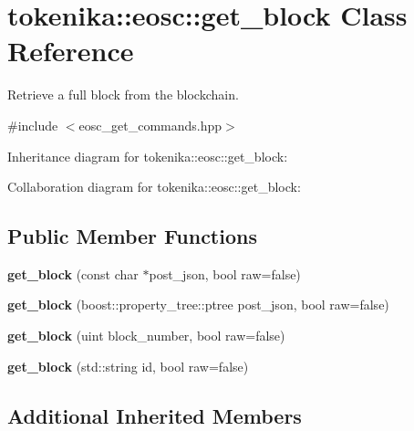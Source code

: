 \hypertarget{classtokenika_1_1eosc_1_1get__block}{}\section{tokenika\+:\+:eosc\+:\+:get\+\_\+block Class Reference}
\label{classtokenika_1_1eosc_1_1get__block}


Retrieve a full block from the blockchain.  




{\ttfamily \#include $<$eosc\+\_\+get\+\_\+commands.\+hpp$>$}



Inheritance diagram for tokenika\+:\+:eosc\+:\+:get\+\_\+block\+:


Collaboration diagram for tokenika\+:\+:eosc\+:\+:get\+\_\+block\+:
\subsection*{Public Member Functions}
\begin{DoxyCompactItemize}
\item 
\mbox{\label{classtokenika_1_1eosc_1_1get__block_ae2c0ee2ee1f93c982be9644238ac2e08}} 
{\bfseries get\+\_\+block} (const char $\ast$post\+\_\+json, bool raw=false)
\item 
\mbox{\label{classtokenika_1_1eosc_1_1get__block_a8d6bd95d65d6bd8265dc3fb23e5e0350}} 
{\bfseries get\+\_\+block} (boost\+::property\+\_\+tree\+::ptree post\+\_\+json, bool raw=false)
\item 
\mbox{\label{classtokenika_1_1eosc_1_1get__block_aa10c691423132ab06125109f47fee9c8}} 
{\bfseries get\+\_\+block} (uint block\+\_\+number, bool raw=false)
\item 
\mbox{\label{classtokenika_1_1eosc_1_1get__block_aa1ffb3b8232831490b3655cc2571b634}} 
{\bfseries get\+\_\+block} (std\+::string id, bool raw=false)
\end{DoxyCompactItemize}
\subsection*{Additional Inherited Members}


